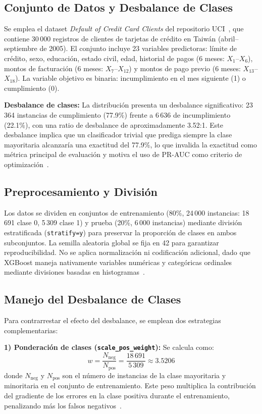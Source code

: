 \documentclass[journal]{IEEEtran}
\begin{document}
\subsection{Conjunto de Datos y Desbalance de Clases}
Se emplea el dataset \textit{Default of Credit Card Clients} del repositorio UCI~\cite{yeh2009}, que contiene 30\,000 registros de clientes de tarjetas de crédito en Taiwán (abril--septiembre de 2005). El conjunto incluye 23 variables predictoras: límite de crédito, sexo, educación, estado civil, edad, historial de pagos (6 meses: $X_1$--$X_6$), montos de facturación (6 meses: $X_7$--$X_{12}$) y montos de pago previo (6 meses: $X_{13}$--$X_{18}$). La variable objetivo es binaria: incumplimiento en el mes siguiente (1) o cumplimiento (0).

\textbf{Desbalance de clases:} La distribución presenta un desbalance significativo: 23\,364 instancias de cumplimiento (77.9\%) frente a 6\,636 de incumplimiento (22.1\%), con una ratio de desbalance de aproximadamente 3.52:1. Este desbalance implica que un clasificador trivial que prediga siempre la clase mayoritaria alcanzaría una exactitud del 77.9\%, lo que invalida la exactitud como métrica principal de evaluación y motiva el uso de PR-AUC como criterio de optimización~\cite{he2009, davis2006, saito2015}.

\subsection{Preprocesamiento y División}
Los datos se dividen en conjuntos de entrenamiento (80\%, 24\,000 instancias: 18\,691 clase 0, 5\,309 clase 1) y prueba (20\%, 6\,000 instancias) mediante división estratificada (\texttt{stratify=y}) para preservar la proporción de clases en ambos subconjuntos. La semilla aleatoria global se fija en 42 para garantizar reproducibilidad. No se aplica normalización ni codificación adicional, dado que XGBoost maneja nativamente variables numéricas y categóricas ordinales mediante divisiones basadas en histogramas~\cite{chen2016}.

\subsection{Manejo del Desbalance de Clases}
Para contrarrestar el efecto del desbalance, se emplean dos estrategias complementarias:

\textbf{1) Ponderación de clases (\texttt{scale\_pos\_weight}):} Se calcula como:
\begin{equation}
    w = \frac{N_{\text{neg}}}{N_{\text{pos}}} = \frac{18\,691}{5\,309} \approx 3.5206
    \label{eq:spw}
\end{equation}
donde $N_{\text{neg}}$ y $N_{\text{pos}}$ son el número de instancias de la clase mayoritaria y minoritaria en el conjunto de entrenamiento. Este peso multiplica la contribución del gradiente de los errores en la clase positiva durante el entrenamiento, penalizando más los falsos negativos~\cite{chen2016, he2009}.
\end{document}
